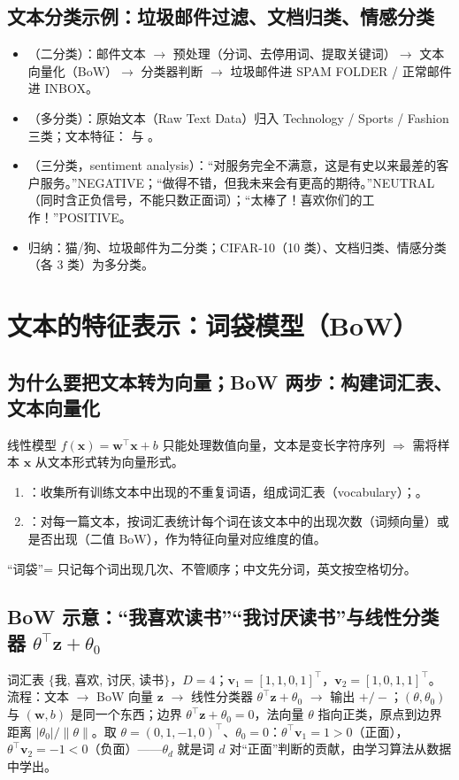 \subsection{文本分类示例：垃圾邮件过滤、文档归类、情感分类}
\begin{itemize}
\item {}（二分类）：邮件文本 $\to$ 预处理（分词、去停用词、提取关键词）$\to$ 文本向量化（BoW）$\to$ 分类器判断 $\to$ 垃圾邮件进 SPAM FOLDER / 正常邮件进 INBOX。
\item {}（多分类）：原始文本（Raw Text Data）归入 Technology / Sports / Fashion 三类；文本特征： 与 。
\item {}（三分类，sentiment analysis）：“对服务完全不满意，这是有史以来最差的客户服务。”NEGATIVE；“做得不错，但我未来会有更高的期待。”NEUTRAL（同时含正负信号，不能只数正面词）；“太棒了！喜欢你们的工作！”POSITIVE。
\item 归纳：猫/狗、垃圾邮件为二分类；CIFAR-10（10 类）、文档归类、情感分类（各 3 类）为多分类。
\end{itemize}

\section{文本的特征表示：词袋模型（BoW）}\label{sec:D02a-bow}

\subsection{为什么要把文本转为向量；BoW 两步：构建词汇表、文本向量化}
线性模型 $f(\bm x)=\bm w^\top\bm x+b$ 只能处理数值向量，文本是变长字符序列 $\Rightarrow$ 需将样本 $\bm x$ 从文本形式转为向量形式。
\begin{enumerate}
\item {}：收集所有训练文本中出现的不重复词语，组成词汇表（vocabulary）；。
\item {}：对每一篇文本，按词汇表统计每个词在该文本中的出现次数（词频向量）或是否出现（二值 BoW），作为特征向量对应维度的值。
\end{enumerate}
“词袋”= 只记每个词出现几次、不管顺序；中文先分词，英文按空格切分。

\subsection{BoW 示意：“我喜欢读书”“我讨厌读书”与线性分类器 \texorpdfstring{$\theta^\top\bm z+\theta_0$}{theta'z+theta0}}
词汇表 $\{$我, 喜欢, 讨厌, 读书$\}$，$D=4$；$\bm v_1=[1,1,0,1]^\top$，$\bm v_2=[1,0,1,1]^\top$。流程：文本 $\to$ BoW 向量 $\bm z$ $\to$ 线性分类器 $\theta^\top\bm z+\theta_0$ $\to$ 输出 $+/-$；$(\theta,\theta_0)$ 与 $(\bm w,b)$ 是同一个东西；边界 $\theta^\top\bm z+\theta_0=0$，法向量 $\theta$ 指向正类，原点到边界距离 $|\theta_0|/\|\theta\|$。取 $\theta=(0,1,-1,0)^\top$、$\theta_0=0$：$\theta^\top\bm v_1=1>0$（正面），$\theta^\top\bm v_2=-1<0$（负面）——$\theta_d$ 就是词 $d$ 对“正面”判断的贡献，由学习算法从数据中学出。

